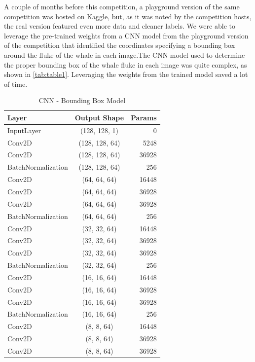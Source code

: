 \documentclass[paper=a4, fontsize=11pt]{scrartcl}
\numberwithin{equation}{section}		%
\numberwithin{table}{section}				%
\begin{document}
A couple of months before this competition, a playground version of the same competition was hosted on Kaggle, but, as it was noted by the competition hosts, the real version featured even more data and cleaner labels. We were able to leverage the pre-trained weights from a CNN model from the playground version of the competition that identified the coordinates specifying a bounding box around the fluke of the whale in each image.The CNN model used to determine the proper bounding box of the whale fluke in each image was quite complex, as shown in \autoref{tab:table1}. Leveraging the weights from the trained model saved a lot of time.

\begin{table}[h!]
  \begin{center}
    \caption{CNN - Bounding Box Model}
    \label{tab:table1}
    \begin{tabular}{l|c|r} %
      \textbf{Layer} & \textbf{Output Shape} & \textbf{Params}\\
      \hline
      InputLayer & (128, 128, 1) & 0\\
      Conv2D & (128, 128, 64) & 5248\\
      Conv2D & (128, 128, 64) & 36928\\
      BatchNormalization & (128, 128, 64) & 256\\
      Conv2D & (64, 64, 64) & 16448\\
      Conv2D & (64, 64, 64) & 36928\\
      Conv2D & (64, 64, 64) & 36928\\
      BatchNormalization & (64, 64, 64) & 256\\
      Conv2D & (32, 32, 64) & 16448\\
      Conv2D & (32, 32, 64) & 36928\\
      Conv2D & (32, 32, 64) & 36928\\
      BatchNormalization & (32, 32, 64) & 256\\
      Conv2D & (16, 16, 64) & 16448\\
      Conv2D & (16, 16, 64) & 36928\\
      Conv2D & (16, 16, 64) & 36928\\
      BatchNormalization & (16, 16, 64) & 256\\
      Conv2D & (8, 8, 64) & 16448\\
      Conv2D & (8, 8, 64) & 36928\\
      Conv2D & (8, 8, 64) & 36928\\

\end{tabular}
\end{center}
\end{table}
\end{document}
